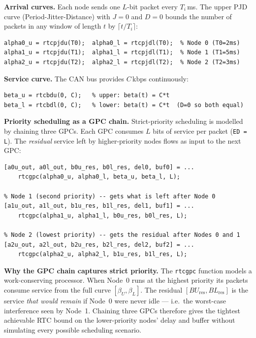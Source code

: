 \documentclass[12pt, a4paper]{article}
\begin{document}
\textbf{Arrival curves.} Each node sends one $L$-bit packet every $T_i$\,ms.
The upper PJD curve (Period-Jitter-Distance) with $J=0$ and $D=0$ bounds the
number of packets in any window of length $t$ by $\lceil t/T_i \rceil$:

\begin{lstlisting}[style=matlab]
alpha0_u = rtcpjdu(T0);  alpha0_l = rtcpjdl(T0);  % Node 0 (T0=2ms)
alpha1_u = rtcpjdu(T1);  alpha1_l = rtcpjdl(T1);  % Node 1 (T1=5ms)
alpha2_u = rtcpjdu(T2);  alpha2_l = rtcpjdl(T2);  % Node 2 (T2=3ms)
\end{lstlisting}

\textbf{Service curve.} The CAN bus provides $C$\,kbps continuously:
\begin{lstlisting}[style=matlab]
beta_u = rtcbdu(0, C);   % upper: beta(t) = C*t
beta_l = rtcbdl(0, C);   % lower: beta(t) = C*t  (D=0 so both equal)
\end{lstlisting}

\textbf{Priority scheduling as a GPC chain.}
Strict-priority scheduling is modelled by chaining three GPCs.
Each GPC consumes $L$ bits of service per packet (\texttt{ED = L}).
The \emph{residual} service left by higher-priority nodes flows as input to the
next GPC:

\begin{lstlisting}[style=matlab]
% Node 0 (highest priority) -- gets the full CAN bus service
[a0u_out, a0l_out, b0u_res, b0l_res, del0, buf0] = ...
    rtcgpc(alpha0_u, alpha0_l, beta_u, beta_l, L);

% Node 1 (second priority) -- gets what is left after Node 0
[a1u_out, a1l_out, b1u_res, b1l_res, del1, buf1] = ...
    rtcgpc(alpha1_u, alpha1_l, b0u_res, b0l_res, L);

% Node 2 (lowest priority) -- gets the residual after Nodes 0 and 1
[a2u_out, a2l_out, b2u_res, b2l_res, del2, buf2] = ...
    rtcgpc(alpha2_u, alpha2_l, b1u_res, b1l_res, L);
\end{lstlisting}

\begin{notebox}
  \textbf{Why the GPC chain captures strict priority.}
  The \texttt{rtcgpc} function models a work-conserving processor.
  When Node~0 runs at the highest priority its packets consume service
  from the full curve $[\beta_U, \beta_L]$.
  The residual $[BU_\mathrm{res}, BL_\mathrm{res}]$ is the service
  \emph{that would remain} if Node~0 were never idle --- i.e.\ the worst-case
  interference seen by Node~1.
  Chaining three GPCs therefore gives the tightest achievable RTC bound on
  the lower-priority nodes' delay and buffer without simulating every possible
  scheduling scenario.
\end{notebox}
\end{document}
